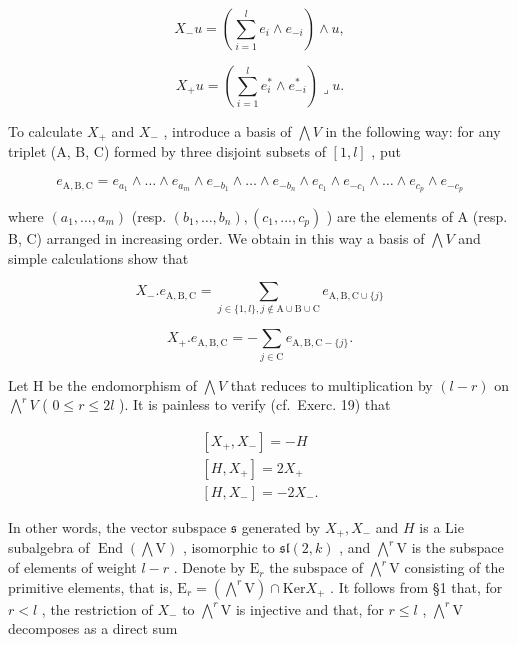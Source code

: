 \[
X _ {-} u = \left(\sum_ {i = 1} ^ {l} e _ {i} \wedge e _ {- i}\right) \wedge u,
\]

\[
X _ {+} u = \left(\sum_ {i = 1} ^ {l} e _ {i} ^ {*} \wedge e _ {- i} ^ {*}\right) \lrcorner u.
\]

To calculate \(X_{+}\) and \(X_{-}\) , introduce a basis of \(\bigwedge V\) in the following way: for any triplet (A, B, C) formed by three disjoint subsets of \([1, l]\) , put

\[
e _ {\mathrm{A,B,C}} = e _ {a _ {1}} \wedge \dots \wedge e _ {a _ {m}} \wedge e _ {- b _ {1}} \wedge \dots \wedge e _ {- b _ {n}} \wedge e _ {c _ {1}} \wedge e _ {- c _ {1}} \wedge \dots \wedge e _ {c _ {p}} \wedge e _ {- c _ {p}}
\]

where \((a_{1},\ldots,a_{m})\) (resp. \((b_{1},\ldots,b_{n}),(c_{1},\ldots,c_{p})\) ) are the elements of A (resp. B, C) arranged in increasing order. We obtain in this way a basis of \(\bigwedge V\) and simple calculations show that

\[
X _ {-}. e _ {\mathrm{A,B,C}} = \sum_ {j \in \{1, l \}, j \notin \mathrm{A} \cup \mathrm{B} \cup \mathrm{C}} e _ {\mathrm{A,B,C} \cup \{j \}}\tag{8}
\]

\[
X _ {+}. e _ {\mathrm{A,B,C}} = - \sum_ {j \in \mathrm{C}} e _ {\mathrm{A,B,C-} \{j \}}.\tag{9}
\]

Let H be the endomorphism of \(\bigwedge V\) that reduces to multiplication by \((l - r)\) on \(\bigwedge^{r}V\) ( \(0 \leq r \leq 2l\) ). It is painless to verify (cf.~Exerc. 19) that

\[
\begin{array}{c} {[ X _ {+}, X _ {-} ] = - H} \\ {[ H, X _ {+} ] = 2 X _ {+}} \\ {[ H, X _ {-} ] = - 2 X _ {-}.} \end{array}
\]

In other words, the vector subspace \(\mathfrak{s}\) generated by \(X_{+}, X_{-}\) and \(H\) is a Lie subalgebra of \(\operatorname{End}(\bigwedge \mathrm{V})\) , isomorphic to \(\mathfrak{sl}(2, k)\) , and \(\bigwedge^{r} \mathrm{V}\) is the subspace of elements of weight \(l - r\) . Denote by \(\mathrm{E}_{r}\) the subspace of \(\bigwedge^{r} \mathrm{V}\) consisting of the primitive elements, that is, \(\mathrm{E}_{r} = (\bigwedge^{r} \mathrm{V}) \cap \mathrm{Ker} X_{+}\) . It follows from §1 that, for \(r < l\) , the restriction of \(X_{-}\) to \(\bigwedge^{r} \mathrm{V}\) is injective and that, for \(r \leq l\) , \(\bigwedge^{r} \mathrm{V}\) decomposes as a direct sum

